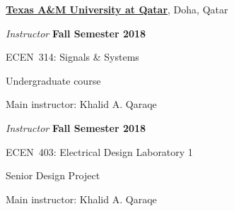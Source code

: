 \documentclass[10pt]{article}
\newcommand{\halfblankline}{\quad\vspace{-0.5\baselineskip}\pagebreak[3]}
\begin{document}
\href{http://www.qatar.tamu.edu/}{\textbf{Texas A\&M University at Qatar}},
Doha, Qatar
\begin{outerlist}
\item[] \textit{Instructor} \hfill \textbf{Fall Semester 2018}
    \begin{innerlist}
        \item ECEN~314: Signals \& Systems
        \begin{innerlist}
            \item[] Undergraduate course
            \item[] Main instructor: Khalid A. Qaraqe
        \end{innerlist}
    \end{innerlist}

\item[] \textit{Instructor} \hfill \textbf{Fall Semester 2018}
    \begin{innerlist}
        \item ECEN~403: Electrical Design Laboratory 1
        \begin{innerlist}
            \item[] Senior Design Project
            \item[] Main instructor: Khalid A. Qaraqe
        \end{innerlist}
    \end{innerlist}
\end{outerlist}

\halfblankline
\end{document}
